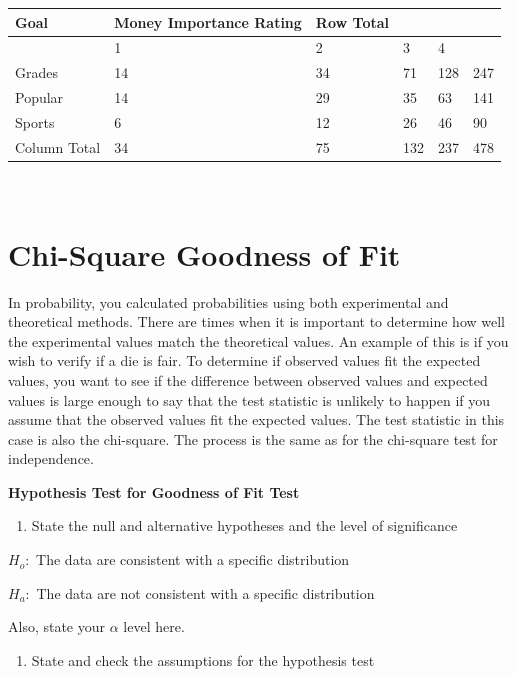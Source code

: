 \documentclass[]{book}
\providecommand{\tightlist}{%
  \setlength{\itemsep}{0pt}\setlength{\parskip}{0pt}}
\begin{document}
\begin{longtable}[]{@{}llllll@{}}
\toprule
Goal & Money Importance Rating & Row Total & & &\tabularnewline
\midrule
\endhead
& 1 & 2 & 3 & 4 &\tabularnewline
Grades & 14 & 34 & 71 & 128 & 247\tabularnewline
Popular & 14 & 29 & 35 & 63 & 141\tabularnewline
Sports & 6 & 12 & 26 & 46 & 90\tabularnewline
Column Total & 34 & 75 & 132 & 237 & 478\tabularnewline
\bottomrule
\end{longtable}

\textbf{\\
}

\hypertarget{chi-square-goodness-of-fit}{%
\section{Chi-Square Goodness of Fit}\label{chi-square-goodness-of-fit}}

In probability, you calculated probabilities using both experimental and theoretical methods. There are times when it is important to determine how well the experimental values match the theoretical values. An example of this is if you wish to verify if a die is fair. To determine if observed values fit the expected values, you want to see if the difference between observed values and expected values is large enough to say that the test statistic is unlikely to happen if you assume that the observed values fit the expected values. The test statistic in this case is also the chi-square. The process is the same as for the chi-square test for independence.

\textbf{Hypothesis Test for Goodness of Fit Test}

\begin{enumerate}
\def\labelenumi{\arabic{enumi}.}
\tightlist
\item
  State the null and alternative hypotheses and the level of significance
\end{enumerate}

\(H_o:\) The data are consistent with a specific distribution

\(H_a:\) The data are not consistent with a specific distribution

Also, state your \(\alpha\) level here.

\begin{enumerate}
\def\labelenumi{\arabic{enumi}.}
\setcounter{enumi}{1}
\tightlist
\item
  State and check the assumptions for the hypothesis test
\end{enumerate}
\end{document}
